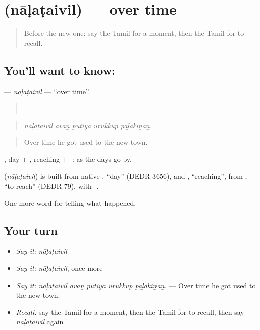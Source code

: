 \section[\texorpdfstring{\ta{நாளடைவில்} (nāḷaṭaivil)}{நாளடைவில் (nāḷaṭaivil)}]{ (nāḷaṭaivil) — over time}

\label{lesson:TA-C314-nalataivil}



\begin{quote}
Before the new one: say the Tamil for a moment, then the Tamil for to recall.
\end{quote}

\subsection*{You'll want to know: }
\textbf{} — \emph{nāḷaṭaivil} — \textquotedblleft{}over time\textquotedblright{}.

\begin{quote}
    .
\end{quote}

\begin{quote}
\emph{nāḷaṭaivil avaṉ putiya ūrukkup paḻakiṉāṉ.}
\end{quote}

\begin{quote}
Over time he got used to the new town.
\end{quote}

, day + , reaching + -: as the days go by.

\begin{cousinweb}
\textbf{} (\emph{nāḷaṭaivil}) is built from native , \textquotedblleft{}day\textquotedblright{} (DEDR 3656), and , \textquotedblleft{}reaching\textquotedblright{}, from , \textquotedblleft{}to reach\textquotedblright{} (DEDR 79), with -.
\end{cousinweb}

\begin{grammarlens}[title={What you've built}]
One more word for telling what happened.
\end{grammarlens}

\subsection*{Your turn}
\begin{itemize}
\raggedright
  \item \emph{Say it:} \emph{nāḷaṭaivil}
  \item \emph{Say it:} \emph{nāḷaṭaivil}, once more
  \item \emph{Say it:} \emph{nāḷaṭaivil avaṉ putiya ūrukkup paḻakiṉāṉ.} — Over time he got used to the new town.
  \item \emph{Recall:} say the Tamil for a moment, then the Tamil for to recall, then say \emph{nāḷaṭaivil} again
\end{itemize}

